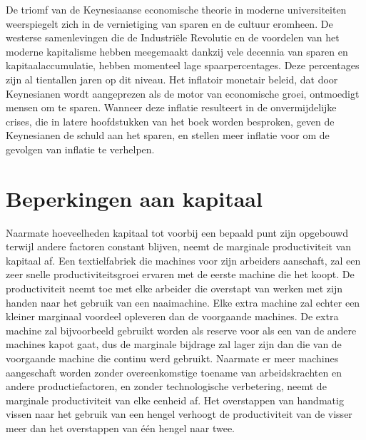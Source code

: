 \documentclass[
  a5paper,
  smalldemyvopaper,11pt,twoside,onecolumn,openright,extrafontsizes,
hidelinks]{memoir}
\begin{document}
De triomf van de Keynesiaanse economische theorie in moderne
universiteiten weerspiegelt zich in de vernietiging van sparen en de
cultuur eromheen. De westerse samenlevingen die de Industriële Revolutie
en de voordelen van het moderne kapitalisme hebben meegemaakt dankzij
vele decennia van sparen en kapitaalaccumulatie, hebben momenteel lage
spaarpercentages. Deze percentages zijn al tientallen jaren op dit
niveau. Het inflatoir monetair beleid, dat door Keynesianen wordt
aangeprezen als de motor van economische groei, ontmoedigt mensen om te
sparen. Wanneer deze inflatie resulteert in de onvermijdelijke crises,
die in latere hoofdstukken van het boek worden besproken, geven de
Keynesianen de schuld aan het sparen, en stellen meer inflatie voor om
de gevolgen van inflatie te verhelpen.

\section{Beperkingen aan kapitaal}\label{beperkingen-aan-kapitaal}

Naarmate hoeveelheden kapitaal tot voorbij een bepaald punt zijn
opgebouwd terwijl andere factoren constant blijven, neemt de marginale
productiviteit van kapitaal af. Een textielfabriek die machines voor
zijn arbeiders aanschaft, zal een zeer snelle productiviteitsgroei
ervaren met de eerste machine die het koopt. De productiviteit neemt toe
met elke arbeider die overstapt van werken met zijn handen naar het
gebruik van een naaimachine. Elke extra machine zal echter een kleiner
marginaal voordeel opleveren dan de voorgaande machines. De extra
machine zal bijvoorbeeld gebruikt worden als reserve voor als een van de
andere machines kapot gaat, dus de marginale bijdrage zal lager zijn dan
die van de voorgaande machine die continu werd gebruikt. Naarmate er
meer machines aangeschaft worden zonder overeenkomstige toename van
arbeidskrachten en andere productiefactoren, en zonder technologische
verbetering, neemt de marginale productiviteit van elke eenheid af. Het
overstappen van handmatig vissen naar het gebruik van een hengel
verhoogt de productiviteit van de visser meer dan het overstappen van
één hengel naar twee.
\end{document}
